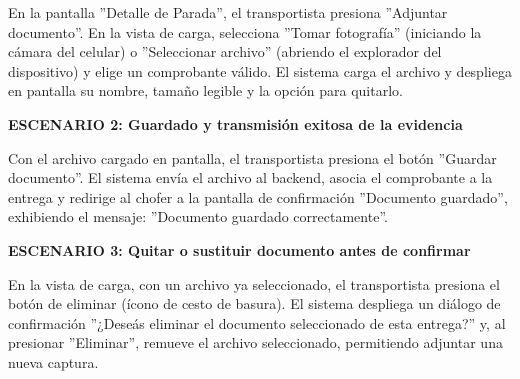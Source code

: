 \documentclass[a4paper,9pt]{article}
\begin{document}
\begin{tcolorbox}[hucard, title={\textbf{HU-55: ADJUNTAR UN DOCUMENTO} \hfill \scriptsize \colorbox{slatestatus}{\textbf{\ Done\ }} \quad \colorbox{white}{\textcolor{primarydark}{\textbf{\ 2 pts\ }}}}]
{En la pantalla ''Detalle de Parada'', el transportista presiona ''Adjuntar documento''. En la vista de carga, selecciona ''Tomar fotografía'' (iniciando la cámara del celular) o ''Seleccionar archivo'' (abriendo el explorador del dispositivo) y elige un comprobante válido. El sistema carga el archivo y despliega en pantalla su nombre, tamaño legible y la opción para quitarlo.\par\vspace{2.5pt}
\noindent\textbf{\textcolor{secondarydark}{ESCENARIO 2:  Guardado y transmisión exitosa de la evidencia}}\par\vspace{1pt}
Con el archivo cargado en pantalla, el transportista presiona el botón ''Guardar documento''. El sistema envía el archivo al backend, asocia el comprobante a la entrega y redirige al chofer a la pantalla de confirmación ''Documento guardado'', exhibiendo el mensaje: ''Documento guardado correctamente''.\par\vspace{2.5pt}
\noindent\textbf{\textcolor{secondarydark}{ESCENARIO 3:  Quitar o sustituir documento antes de confirmar}}\par\vspace{1pt}
En la vista de carga, con un archivo ya seleccionado, el transportista presiona el botón de eliminar (ícono de cesto de basura). El sistema despliega un diálogo de confirmación ''¿Deseás eliminar el documento seleccionado de esta entrega?'' y, al presionar ''Eliminar'', remueve el archivo seleccionado, permitiendo adjuntar una nueva captura.\par\vspace{2.5pt}
}\par
\end{tcolorbox}
\end{document}
